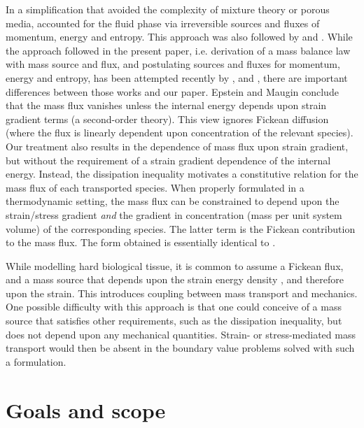In a simplification that avoided the complexity of mixture theory
or porous media, \cite{CowinHegedus:76} accounted for the fluid
phase via irreversible sources and fluxes of momentum, energy and
entropy. This approach was also followed by
\cite{EpsteinMaugin:2000} and \cite{KuhlSteinmann:02}. While the
approach followed in the present paper, i.e. derivation of a mass
balance law with mass source and flux, and postulating sources and
fluxes for momentum, energy and entropy, has been attempted
recently by \cite{EpsteinMaugin:2000}, and
\cite{KuhlSteinmann:02}, there are important differences between
those works and our paper. Epstein and Maugin conclude that the
mass flux vanishes unless the internal energy depends upon strain
gradient terms (a second-order theory). This view ignores Fickean
diffusion (where the flux is linearly dependent upon concentration
of the relevant species). Our treatment also results in the
dependence of mass flux upon strain gradient, but without the
requirement of a strain gradient dependence of the internal
energy. Instead, the dissipation inequality motivates a
constitutive relation for the mass flux of each transported
species. When properly formulated in a thermodynamic setting, the
mass flux can be constrained to depend upon the strain/stress
gradient \emph{and} the gradient in concentration (mass per unit
system volume) of the corresponding species. The latter term is
the Fickean contribution to the mass flux. The form obtained is
essentially identical to \cite{DeGrootMazur:1984}.

While modelling hard biological tissue, it is common to assume a
Fickean flux, and a mass source that depends upon the strain
energy density \citep{HarriganHamilton:1993}, and therefore upon
the strain. This introduces coupling between mass transport and
mechanics. One possible difficulty with this approach is that one
could conceive of a mass source that satisfies other requirements,
such as the dissipation inequality, but does not depend upon any
mechanical quantities. Strain- or stress-mediated mass transport
would then be absent in the boundary value problems solved with
such a formulation.

\section{Goals and scope}
\label{goals}

